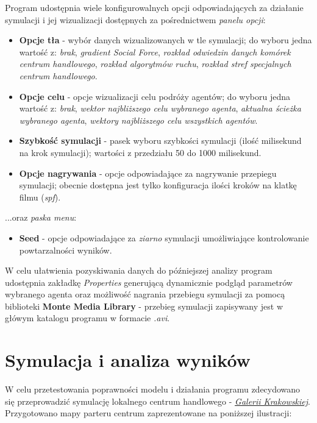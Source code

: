 \documentclass[a4paper, 12pt]{article}
\begin{document}
        Program udostępnia wiele konfigurowalnych opcji odpowiadających za działanie symulacji i jej wizualizacji dostępnych za pośrednictwem \emph{panelu opcji}:

        \begin{itemize}
            \item \textbf{Opcje tła} - wybór danych wizualizowanych w tle symulacji; do wyboru jedna wartość z: \emph{brak}, \emph{gradient Social Force}, \emph{rozkład odwiedzin danych komórek centrum handlowego}, \emph{rozkład algorytmów ruchu}, \emph{rozkład stref specjalnych centrum handlowego}.
            \item \textbf{Opcje celu} - opcje wizualizacji celu podróży agentów; do wyboru jedna wartość z: \emph{brak}, \emph{wektor najbliższego celu wybranego agenta}, \emph{aktualna ścieżka wybranego agenta}, \emph{wektory najbliższego celu wszystkich agentów}.
            \item \textbf{Szybkość symulacji} - pasek wyboru szybkości symulacji (ilość milisekund na krok symulacji); wartości z przedziału 50 do 1000 milisekund.
            \item \textbf{Opcje nagrywania} - opcje odpowiadające za nagrywanie przepiegu symulacji; obecnie dostępna jest tylko konfiguracja ilości kroków na klatkę filmu (\emph{spf}).
        \end{itemize}

        \noindent
        ...oraz \emph{paska menu}:

        \begin{itemize}
            \item \textbf{Seed} - opcje odpowiadające za \emph{ziarno} symulacji umożliwiające kontrolowanie powtarzalności wyników.
        \end{itemize}

        W celu ułatwienia pozyskiwania danych do późniejszej analizy program udostępnia zakładkę \emph{Properties} generującą dynamicznie podgląd parametrów wybranego agenta oraz możliwość nagrania przebiegu symulacji za pomocą biblioteki \textbf{Monte Media Library} - przebieg symulacji zapisywany jest w główym katalogu programu w formacie \emph{.avi}.

\newpage
    \section{Symulacja i analiza wyników}
    \label{sec:sim}

    W celu przetestowania poprawności modelu i działania programu zdecydowano się przeprowadzić symulację lokalnego centrum handlowego - \href{http://www.galeria-krakowska.pl/}{\emph{Galerii Krakowskiej}}. Przygotowano mapy parteru centrum zaprezentowane na poniższej ilustracji:
\end{document}
